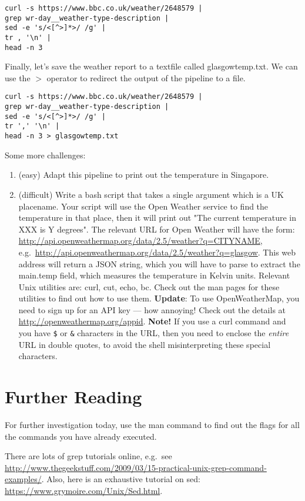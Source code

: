\documentclass{article}
\begin{document}
\begin{lstlisting}[style=BashInputStyle]
curl -s https://www.bbc.co.uk/weather/2648579 | 
grep wr-day__weather-type-description |  
sed -e 's/<[^>]*>/ /g' | 
tr , '\n' | 
head -n 3
\end{lstlisting}


Finally, let's save the weather report to a textfile called glasgowtemp.txt. We can use the $>$  operator to redirect the output of the pipeline to a file.

\begin{lstlisting}[style=BashInputStyle]
curl -s https://www.bbc.co.uk/weather/2648579 | 
grep wr-day__weather-type-description |  
sed -e 's/<[^>]*>/ /g' | 
tr ',' '\n' | 
head -n 3 > glasgowtemp.txt
\end{lstlisting}

Some more challenges:
\begin{enumerate}
\item (easy) Adapt this pipeline to print out the temperature in Singapore.
\item (difficult) Write a bash script that takes a single argument which is a UK placename. Your script will use the Open Weather service to find the temperature in that place, then it will print out "The current temperature in XXX is Y degrees".
The relevant URL for Open Weather will have the form:
\url{http://api.openweathermap.org/data/2.5/weather?q=CITYNAME}, e.g.\
\url{http://api.openweathermap.org/data/2.5/weather?q=glasgow}.
This web address will return a JSON string, which you will have to parse to extract the main.temp field, which measures the temperature in Kelvin units.
Relevant Unix utilities are: \textsf{curl}, \textsf{cut}, \textsf{echo}, \textsf{bc}. Check out the man pages for these utilities to find out how to use them. \textbf{Update}: To use OpenWeatherMap, you need to sign up for an API key --- how annoying! Check out the details at \url{http://openweathermap.org/appid}. \textbf{Note!} If you use a curl command and you have \verb+$+ or \verb+&+ characters in the URL, then you need to enclose the \textit{entire} URL in double quotes, to avoid the shell misinterpreting these special characters.
\end{enumerate}

\section*{Further Reading}

For further investigation today, use the man command to find out 
the flags for all the commands you have already executed.

There are lots of grep tutorials online, e.g.\ see \url{http://www.thegeekstuff.com/2009/03/15-practical-unix-grep-command-examples/}.
Also, here is an exhaustive tutorial on sed: \url{https://www.grymoire.com/Unix/Sed.html}.
\end{document}
